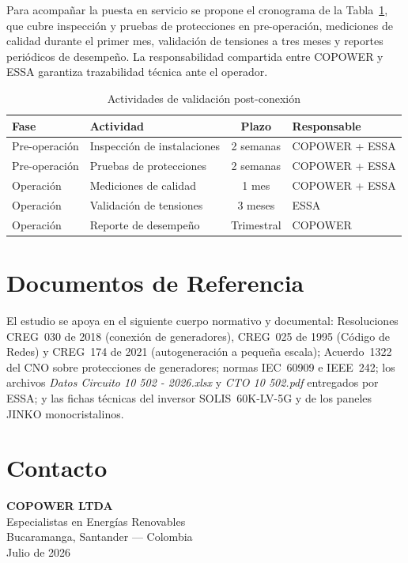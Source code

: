Para acompañar la puesta en servicio se propone el cronograma de la Tabla~\ref{tab:cronograma}, que cubre inspección y pruebas de protecciones en pre-operación, mediciones de calidad durante el primer mes, validación de tensiones a tres meses y reportes periódicos de desempeño. La responsabilidad compartida entre COPOWER y ESSA garantiza trazabilidad técnica ante el operador.

\begin{table}[H]
    \centering
    \caption{Actividades de validación post-conexión}
    \label{tab:cronograma}
    \begin{tabular}{llcl}
    \toprule
    \textbf{Fase} & \textbf{Actividad} & \textbf{Plazo} & \textbf{Responsable} \\
    \midrule
    Pre-operación & Inspección de instalaciones & 2 semanas & COPOWER + ESSA \\
    Pre-operación & Pruebas de protecciones & 2 semanas & COPOWER + ESSA \\
    Operación & Mediciones de calidad & 1 mes & COPOWER + ESSA \\
    Operación & Validación de tensiones & 3 meses & ESSA \\
    Operación & Reporte de desempeño & Trimestral & COPOWER \\
    \bottomrule
    \end{tabular}
\end{table}

\section{Documentos de Referencia}

El estudio se apoya en el siguiente cuerpo normativo y documental: Resoluciones CREG~030 de 2018 (conexión de generadores), CREG~025 de 1995 (Código de Redes) y CREG~174 de 2021 (autogeneración a pequeña escala); Acuerdo~1322 del CNO sobre protecciones de generadores; normas IEC~60909 e IEEE~242; los archivos \textit{Datos Circuito 10 502 - 2026.xlsx} y \textit{CTO 10 502.pdf} entregados por ESSA; y las fichas técnicas del inversor SOLIS~60K-LV-5G y de los paneles JINKO monocristalinos.

\section{Contacto}

\begin{center}
    \textbf{COPOWER LTDA} \\
    Especialistas en Energías Renovables \\
    Bucaramanga, Santander --- Colombia \\
    Julio de 2026
\end{center}
